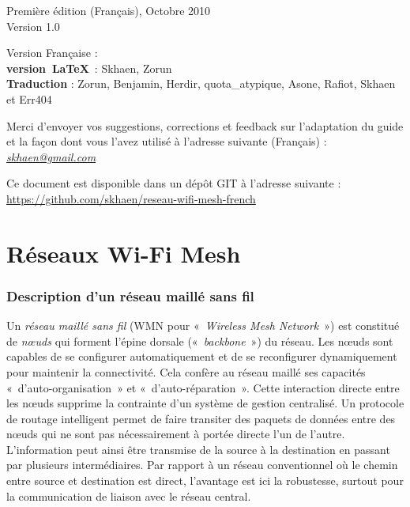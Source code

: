 \documentclass[a4paper,french,11pt,twoside]{article}
\begin{document}
\bigskip
\medskip
\noindent Première édition (Français), Octobre 2010\\
\noindent Version 1.0

\bigskip
\noindent Version Française : \\
\noindent \textbf{version~\LaTeX}~: Skhaen, Zorun \\
\noindent \textbf{Traduction} : Zorun, Benjamin, Herdir, quota\_atypique, Asone, Rafiot, Skhaen et Err404

\bigskip
Merci d'envoyer vos suggestions, corrections et feedback sur l'adaptation du guide et la façon dont vous l'avez utilisé à l'adresse suivante (Français) : \href{mailto:skhaen@gmail.com}{\textit{skhaen@gmail.com}}

\bigskip
Ce document est disponible dans un dépôt GIT à l'adresse suivante :\\
\noindent \url{https://github.com/skhaen/reseau-wifi-mesh-french}

\newpage
\thispagestyle{empty}
\tableofcontents
\thispagestyle{empty}
\newpage

\setcounter{page}{3}
\part{Réseaux Wi-Fi Mesh}
\section{Description d'un réseau maillé sans fil}

Un \emph{réseau maillé sans fil} (WMN pour «~\textit{Wireless Mesh Network}~») est constitué de \emph{nœuds} qui forment l'épine dorsale («~\textit{backbone}~») du réseau. Les nœuds sont capables de se configurer automatiquement et de se reconfigurer dynamiquement pour maintenir la connectivité. Cela confère au réseau maillé ses capacités «~d'auto-organisation~» et «~d'auto-réparation~». Cette interaction directe entre les nœuds supprime la contrainte d'un système de gestion centralisé. Un protocole de routage intelligent permet de faire transiter des paquets de données entre des nœuds qui ne sont pas nécessairement à portée directe l'un de l'autre. L'information peut ainsi être transmise de la source à la destination en passant par plusieurs intermédiaires. Par rapport à un réseau conventionnel où le chemin entre source et destination est direct, l'avantage est ici la robustesse, surtout pour la communication de liaison avec le réseau central.
\end{document}
